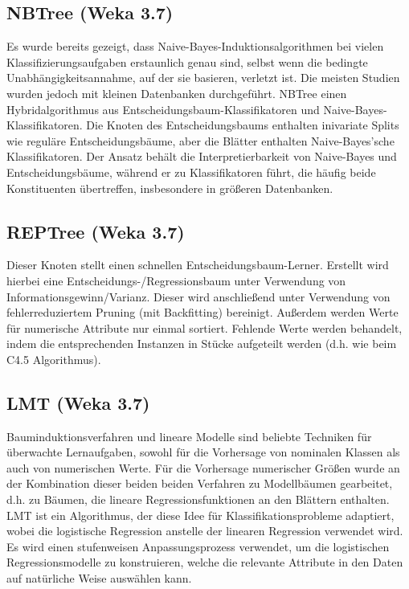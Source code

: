 \documentclass[12pt,					%
							 oneside,			%
							 a4paper,			%
							 halfparskip,		%
							 liststotoc,			%
							 bibtotoc,			%
							 fleqn,				%
							 pointlessnumbers]	%
							 {scrreprt}
\begin{document}
			
		\subsection{NBTree (Weka 3.7)}
			Es wurde bereits gezeigt, dass Naive-Bayes-Induktionsalgorithmen bei vielen Klassifizierungsaufgaben erstaunlich genau sind, selbst wenn die bedingte Unabhängigkeitsannahme, auf der sie basieren, verletzt ist. Die meisten Studien wurden jedoch mit kleinen Datenbanken durchgeführt. NBTree einen Hybridalgorithmus aus Entscheidungsbaum-Klassifikatoren und Naive-Bayes-Klassifikatoren. Die Knoten des Entscheidungsbaums enthalten inivariate Splits wie reguläre Entscheidungsbäume, aber die Blätter enthalten Naive-Bayes'sche Klassifikatoren. Der Ansatz behält die Interpretierbarkeit von Naive-Bayes und Entscheidungsbäume, während er zu Klassifikatoren führt, die häufig beide Konstituenten übertreffen, insbesondere in größeren Datenbanken.\cite{Kohavi1996}
						
		\subsection{REPTree (Weka 3.7)}
			Dieser Knoten stellt einen schnellen Entscheidungsbaum-Lerner. Erstellt wird hierbei eine Entscheidungs-/Regressionsbaum unter Verwendung von Informationsgewinn/Varianz. Dieser wird anschließend unter Verwendung von fehlerreduziertem Pruning (mit Backfitting) bereinigt. Außerdem werden Werte für numerische Attribute nur einmal sortiert. Fehlende Werte werden behandelt, indem die entsprechenden Instanzen in Stücke aufgeteilt werden (d.h. wie beim C4.5 Algorithmus).
		
		\subsection{LMT (Weka 3.7)}
			Bauminduktionsverfahren und lineare Modelle sind beliebte Techniken für überwachte Lernaufgaben, sowohl für die Vorhersage von nominalen Klassen als auch von numerischen Werte. Für die Vorhersage numerischer Größen wurde an der Kombination dieser beiden beiden Verfahren zu \glqq{}Modellbäumen\grqq{} gearbeitet, d.h. zu Bäumen, die lineare Regressionsfunktionen an den Blättern enthalten. LMT ist ein Algorithmus, der diese Idee für Klassifikationsprobleme adaptiert, wobei die logistische Regression anstelle der linearen Regression verwendet wird. Es wird einen stufenweisen Anpassungsprozess verwendet, um die logistischen Regressionsmodelle zu konstruieren, welche die relevante Attribute in den Daten auf natürliche Weise auswählen kann.\cite{Landwehr2005}
						
\end{document}
